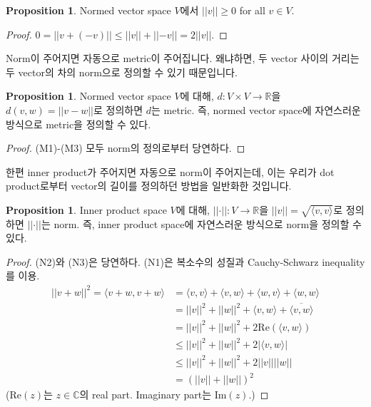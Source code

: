 \documentclass[12pt]{article}
\theoremstyle{definition}
\newtheorem{prop}[thm]{Proposition}
\def\CC{\mathbb{C}}
\newcommand{\abs}[1]{\left\vert#1\right\vert}
\newcommand{\norm}[1]{\left\vert\left\vert#1\right\vert\right\vert}
\newcommand{\inner}[2]{\langle #1, #2\rangle}
\begin{document}
	\begin{prop}
		Normed vector space \(V\)에서 \(\norm{v} \ge 0\) for all \(v \in V\).
	\end{prop}
	\begin{proof}
		\(0 = \norm{v + (-v)} \le \norm{v} + \norm{-v} = 2\norm{v}\).
	\end{proof}


Norm이 주어지면 자동으로 metric이 주어집니다. 왜냐하면, 두 vector 사이의 거리는 두 vector의 차의 norm으로 정의할 수 있기 때문입니다.

	\begin{prop}
		Normed vector space \(V\)에 대해, \(d:V\times V \rightarrow \mathbb{R}\)을 \(d(v, w)=\norm{v-w}\)로 정의하면 \(d\)는 metric. 즉, normed vector space에 자연스러운 방식으로 metric을 정의할 수 있다.
	\end{prop}
	\begin{proof}
		(M1)-(M3) 모두 norm의 정의로부터 당연하다.
	\end{proof}

한편 inner product가 주어지면 자동으로 norm이 주어지는데, 이는 우리가 dot product로부터 vector의 길이를 정의하던 방법을 일반화한 것입니다.

	\begin{prop}
		Inner product space \(V\)에 대해, \(\norm{\cdot}: V \rightarrow \mathbb{R}\)을 \(\norm{v} = \sqrt{\inner{v}{v}}\)로 정의하면 \(\norm{\cdot}\)는 norm. 즉, inner product space에 자연스러운 방식으로 norm을 정의할 수 있다.
	\end{prop}

	\begin{proof}
		(N2)와 (N3)은 당연하다. (N1)은 복소수의 성질과 Cauchy-Schwarz inequality를 이용.
		\begin{align*}
			\norm{v+w}^2 = \inner{v+w}{v+w} &= \inner{v}{v} + \inner{v}{w} + \inner{w}{v} + \inner{w}{w}\\
			&= \norm{v}^2 + \norm{w}^2 + \inner{v}{w} + \overline{\inner{v}{w}}\\
			&= \norm{v}^2 + \norm{w}^2 + 2\mathrm{Re}(\inner{v}{w})\\
			&\le \norm{v}^2 + \norm{w}^2 + 2\abs{\inner{v}{w}}\\
			&\le \norm{v}^2 + \norm{w}^2 + 2\norm{v}\norm{w}\\
			&= (\norm{v} + \norm{w})^2
		\end{align*}
		(\(\mathrm{Re}(z)\)는 \(z \in \CC\)의 real part. Imaginary part는 \(\mathrm{Im}(z)\).)
	\end{proof}
\end{document}
